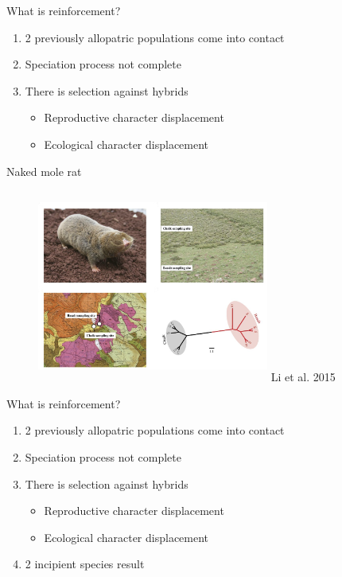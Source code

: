 \documentclass[t,10pt]{beamer}
\begin{document}
\begin{frame}[label={sec:orgheadline21}]{What is reinforcement?}
\begin{enumerate}
\item 2 previously \alert{allopatric} populations come into contact
\item Speciation process not complete
\item There is selection against hybrids
\begin{itemize}
\item Reproductive character displacement
\item<2-> Ecological character displacement
\end{itemize}
\end{enumerate}
\end{frame}

\begin{frame}[label={sec:orgheadline22}]{Naked mole rat}
\begin{figure}[htb]
\centering
\includegraphics[width=3in,height=2.5in]{./Figures/naked_mole_rat.png}
Li et al. 2015
\end{figure}
\end{frame}

\begin{frame}[label={sec:orgheadline23}]{What is reinforcement?}
\begin{enumerate}
\item 2 previously \alert{allopatric} populations come into contact
\item Speciation process not complete
\item There is selection against hybrids
\begin{itemize}
\item Reproductive character displacement
\item Ecological character displacement
\end{itemize}
\item<2-> 2 incipient species result
\end{enumerate}
\end{frame}
\end{document}
